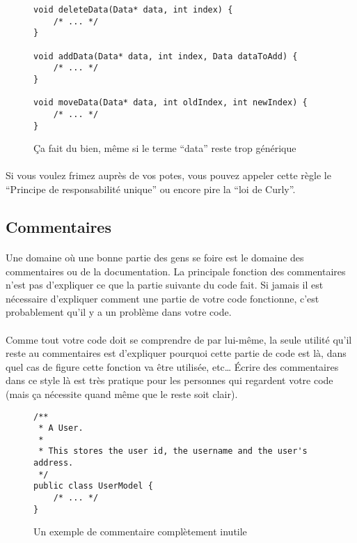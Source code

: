 \begin{figure}[H]
	\centering
	\begin{verbatim}
void deleteData(Data* data, int index) {
	/* ... */
}

void addData(Data* data, int index, Data dataToAdd) {
	/* ... */
}

void moveData(Data* data, int oldIndex, int newIndex) {
	/* ... */
}
	\end{verbatim}
	\caption{Ça fait du bien, même si le terme ``data'' reste trop générique}
\end{figure}

\paragraph{} Si vous voulez frimez auprès de vos potes, vous pouvez appeler
cette règle le ``Principe de responsabilité unique'' ou encore pire la ``loi de
Curly''.

\subsection{Commentaires}

\paragraph{} Une domaine où une bonne partie des gens se foire est le domaine
des commentaires ou de la documentation. La principale fonction des
commentaires n'est pas d'expliquer ce que la partie suivante du code fait. Si
jamais il est nécessaire d'expliquer comment une partie de votre code
fonctionne, c'est probablement qu'il y a un problème dans votre code.

\paragraph{} Comme tout votre code doit se comprendre de par lui-même, la seule
utilité qu'il reste au commentaires est d'expliquer pourquoi cette partie de
code est là, dans quel cas de figure cette fonction va être utilisée, etc\ldots
Écrire des commentaires dans ce style là est très pratique pour les personnes
qui regardent votre code (mais ça nécessite quand même que le reste soit
clair).

\begin{figure}[H]
	\centering
	\begin{verbatim}
/**
 * A User.
 *
 * This stores the user id, the username and the user's address.
 */
public class UserModel {
	/* ... */
}
	\end{verbatim}
	\caption{Un exemple de commentaire complètement inutile}
\end{figure}

